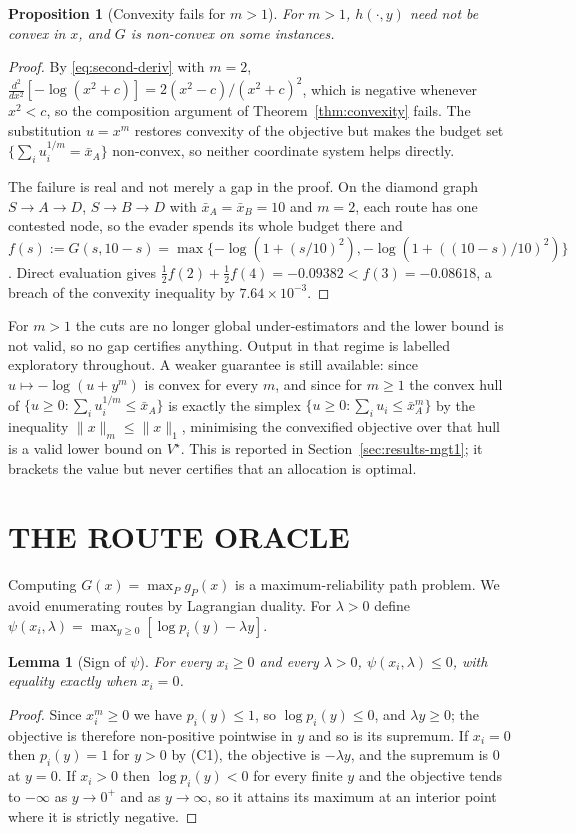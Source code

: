 \documentclass[10pt,a4paper,twoside]{article}
\theoremstyle{plain}
\newtheorem{proposition}[theorem]{Proposition}
\newtheorem{lemma}[theorem]{Lemma}
\theoremstyle{definition}
\newcommand{\XA}{\bar{x}_A}
\newcommand{\XB}{\bar{x}_B}
\begin{document}
\begin{proposition}[Convexity fails for $m>1$]
\label{prop:m-gt-1}
For $m>1$, $h(\cdot,y)$ need not be convex in $x$, and $G$ is non-convex on
some instances.
\end{proposition}
\begin{proof}
By \eqref{eq:second-deriv} with $m=2$,
$\frac{d^2}{dx^2}[-\log(x^2+c)]=2(x^2-c)/(x^2+c)^2$, which is negative
whenever $x^2<c$, so the composition argument of
Theorem~\ref{thm:convexity} fails. The substitution $u=x^m$ restores
convexity of the objective but makes the budget set
$\{\sum_i u_i^{1/m}=\XA\}$ non-convex, so neither coordinate system helps
directly.

The failure is real and not merely a gap in the proof. On the diamond graph
$S\to A\to D$, $S\to B\to D$ with $\XA=\XB=10$ and $m=2$, each route has one
contested node, so the evader spends its whole budget there and
$f(s):=G(s,10-s)=\max\{-\log(1+(s/10)^2),-\log(1+((10-s)/10)^2)\}$. Direct
evaluation gives $\tfrac12f(2)+\tfrac12f(4)=-0.09382<f(3)=-0.08618$, a breach
of the convexity inequality by $7.64\times10^{-3}$.
\end{proof}

For $m>1$ the cuts are no longer global under-estimators and the lower bound
is not valid, so no gap certifies anything. Output in that regime is labelled
exploratory throughout. A weaker guarantee is still available: since
$u\mapsto-\log(u+y^m)$ is convex for every $m$, and since for $m\ge1$ the
convex hull of $\{u\ge0:\sum_i u_i^{1/m}\le\XA\}$ is exactly the simplex
$\{u\ge0:\sum_i u_i\le\XA^m\}$ by the inequality
$\|x\|_m\le\|x\|_1$, minimising the convexified objective over that hull is a
valid lower bound on $V^{\star}$. This is reported in
Section~\ref{sec:results-mgt1}; it brackets the value but never certifies
that an allocation is optimal.

\section{THE ROUTE ORACLE}
\label{sec:oracle}

Computing $G(x)=\max_P g_P(x)$ is a maximum-reliability path problem. We
avoid enumerating routes by Lagrangian duality. For $\lambda>0$ define
$\psi(x_i,\lambda)=\max_{y\ge0}[\log p_i(y)-\lambda y]$.

\begin{lemma}[Sign of $\psi$]
\label{lem:psi}
For every $x_i\ge0$ and every $\lambda>0$, $\psi(x_i,\lambda)\le0$, with
equality exactly when $x_i=0$.
\end{lemma}
\begin{proof}
Since $x_i^m\ge0$ we have $p_i(y)\le1$, so $\log p_i(y)\le0$, and
$\lambda y\ge0$; the objective is therefore non-positive pointwise in $y$ and
so is its supremum. If $x_i=0$ then $p_i(y)=1$ for $y>0$ by (C1), the
objective is $-\lambda y$, and the supremum is $0$ at $y=0$. If $x_i>0$ then
$\log p_i(y)<0$ for every finite $y$ and the objective tends to $-\infty$ as
$y\to0^{+}$ and as $y\to\infty$, so it attains its maximum at an interior
point where it is strictly negative.
\end{proof}
\end{document}
